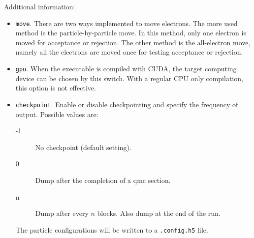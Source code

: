 Additional information:
\begin{itemize}
\item \texttt{move}. There are two ways implemented to move electrons. The more used method is the particle-by-particle move. In this method, only one electron is moved for acceptance or rejection. The other method is the all-electron move, namely all the electrons are moved once for testing acceptance or rejection.

\item \texttt{gpu}. When the executable is compiled with CUDA, the target computing device can be chosen by this switch. With a regular CPU only compilation, this option is not effective.

\item \texttt{checkpoint}.
Enable or disable checkpointing and specify the frequency of output.  Possible values are:
\begin{description}
\item [-1] No checkpoint (default setting).
\item [0] Dump after the completion of a qmc section.
\item [n] Dump after every $n$ blocks.  Also dump at the end of the run.
\end{description}


The particle configurations will be written to a \texttt{.config.h5} file.







\end{itemize}
